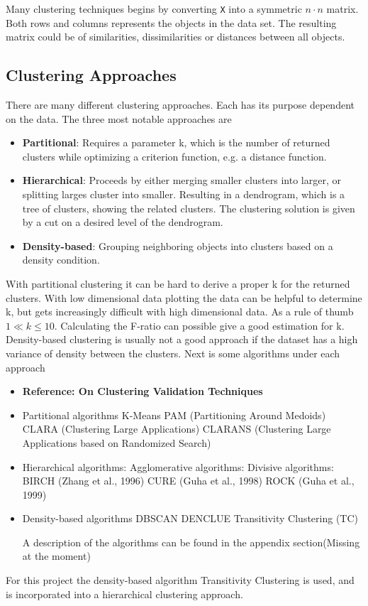 \documentclass[a4paper,10pt]{article}
\theoremstyle{plain}
\theoremstyle{definition}
\begin{document}
Many clustering techniques begins by converting \texttt{X} into a symmetric $n \cdot n$ matrix. Both rows and columns represents the objects in the data set. The resulting matrix could be of similarities, dissimilarities or distances between all objects.

\subsection{Clustering Approaches}
There are many different clustering approaches. Each has its purpose dependent on the data. The three most notable approaches are
\begin{itemize}
	\item \textbf{Partitional}: Requires a parameter k, which is the number of returned clusters while optimizing a criterion function, e.g. a distance function.
	\item \textbf{Hierarchical}: Proceeds by either merging smaller clusters into larger, or splitting larges cluster into smaller. Resulting in a dendrogram, which is a tree of clusters, showing the related clusters. The clustering solution is given by a cut on a desired level of the dendrogram.
	\item \textbf{Density-based}: Grouping neighboring objects into clusters based on a density condition.
\end{itemize}
With partitional clustering it can be hard to derive a proper k for the returned clusters. With low dimensional data plotting the data can be helpful to determine k, but gets increasingly difficult with high dimensional data. As a rule of thumb $1 \ll k \leq 10$. Calculating the F-ratio can possible give a good estimation for k.
Density-based clustering is usually not a good approach if the dataset has a high variance of density between the clusters.
Next is some algorithms under each approach
\begin{itemize}
	\item \textbf{Reference: On Clustering Validation Techniques}
	\item Partitional algorithms
	\subitem K-Means
	\subitem PAM (Partitioning Around Medoids)
	\subitem CLARA (Clustering Large Applications)
	\subitem CLARANS (Clustering Large Applications based on Randomized Search)
	\item Hierarchical algorithms:
	\subitem Agglomerative algorithms:
	\subitem Divisive algorithms:
	\subitem BIRCH (Zhang et al., 1996)
	\subitem CURE (Guha et al., 1998)
	\subitem ROCK (Guha et al., 1999)
	\item Density-based algorithms
	\subitem DBSCAN
	\subitem DENCLUE
	\subitem Transitivity Clustering (TC)
	
	A description of the algorithms can be found in the appendix section(Missing at the moment)
\end{itemize}
For this project the density-based algorithm Transitivity Clustering is used, and is incorporated into a hierarchical clustering approach.
\end{document}
